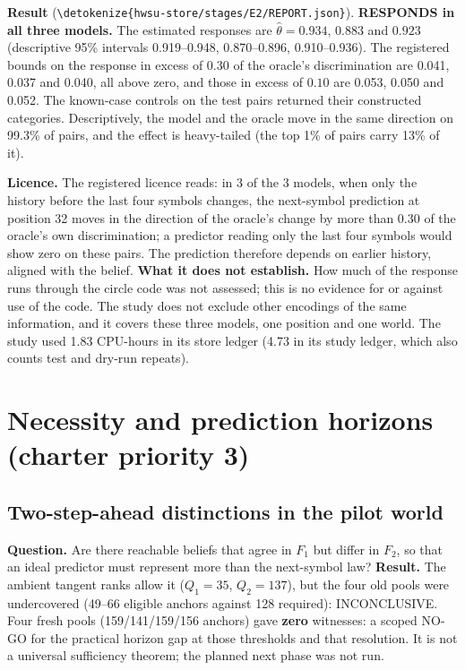 \documentclass[11pt,a4paper]{article}
\DeclareRobustCommand{\_}{\ifmmode\origunderscore\else\textunderscore\allowbreak\fi}
\DeclareRobustCommand{\fpath}[1]{\begingroup\small\expandafter\nolinkurl\expandafter{\detokenize{#1}}\endgroup}
\begin{document}
\textbf{Result} (\fpath{hwsu-store/stages/E2/REPORT.json}). \textbf{RESPONDS in all three models.}
The estimated responses are $\hat\theta=0.934$, $0.883$ and $0.923$ (descriptive 95\% intervals
0.919--0.948, 0.870--0.896, 0.910--0.936). The registered bounds on the response in excess of
$0.30$ of the oracle's discrimination are 0.041, 0.037 and 0.040, all above zero, and those in
excess of $0.10$ are 0.053, 0.050 and 0.052. The known-case controls on the test pairs returned
their constructed categories. Descriptively, the model and the oracle move in the same direction
on 99.3\% of pairs, and the effect is heavy-tailed (the top 1\% of pairs carry 13\% of it).

\textbf{Licence.} The registered licence reads: in 3 of the 3 models, when only the history before
the last four symbols changes, the next-symbol prediction at position 32 moves in the direction of
the oracle's change by more than 0.30 of the oracle's own discrimination; a predictor reading only
the last four symbols would show zero on these pairs. The prediction therefore depends on earlier
history, aligned with the belief. \textbf{What it does not establish.} How much of the response
runs through the circle code was not assessed; this is no evidence for or against use of the code.
The study does not exclude other encodings of the same information, and it covers these three
models, one position and one world. The study used 1.83 CPU-hours in its store ledger (4.73 in its
study ledger, which also counts test and dry-run repeats).


\section{Necessity and prediction horizons (charter priority 3)}\label{sec:horizons}

\subsection{Two-step-ahead distinctions in the pilot world}
\textbf{Question.} Are there reachable beliefs that agree in $F_1$ but differ in $F_2$, so that an
ideal predictor must represent more than the next-symbol law? \textbf{Result.} The ambient tangent
ranks allow it ($Q_1=35$, $Q_2=137$), but the four old pools were undercovered (49--66 eligible
anchors against 128 required): INCONCLUSIVE. Four fresh pools (159/141/159/156 anchors)
gave \textbf{zero} witnesses: a scoped NO-GO for the practical horizon gap at those thresholds and
that resolution. It is not a universal sufficiency theorem; the planned next phase was not run.
\end{document}
